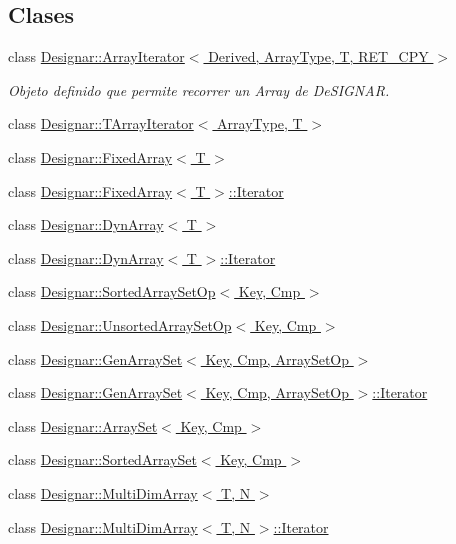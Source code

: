 \subsection*{Clases}
\begin{DoxyCompactItemize}
\item 
class \hyperlink{class_designar_1_1_array_iterator}{Designar\+::\+Array\+Iterator$<$ Derived, Array\+Type, T, R\+E\+T\+\_\+\+C\+P\+Y $>$}
\begin{DoxyCompactList}\small\item\em Objeto definido que permite recorrer un Array de De\+S\+I\+G\+N\+AR. \end{DoxyCompactList}\item 
class \hyperlink{class_designar_1_1_t_array_iterator}{Designar\+::\+T\+Array\+Iterator$<$ Array\+Type, T $>$}
\item 
class \hyperlink{class_designar_1_1_fixed_array}{Designar\+::\+Fixed\+Array$<$ T $>$}
\item 
class \hyperlink{class_designar_1_1_fixed_array_1_1_iterator}{Designar\+::\+Fixed\+Array$<$ T $>$\+::\+Iterator}
\item 
class \hyperlink{class_designar_1_1_dyn_array}{Designar\+::\+Dyn\+Array$<$ T $>$}
\item 
class \hyperlink{class_designar_1_1_dyn_array_1_1_iterator}{Designar\+::\+Dyn\+Array$<$ T $>$\+::\+Iterator}
\item 
class \hyperlink{class_designar_1_1_sorted_array_set_op}{Designar\+::\+Sorted\+Array\+Set\+Op$<$ Key, Cmp $>$}
\item 
class \hyperlink{class_designar_1_1_unsorted_array_set_op}{Designar\+::\+Unsorted\+Array\+Set\+Op$<$ Key, Cmp $>$}
\item 
class \hyperlink{class_designar_1_1_gen_array_set}{Designar\+::\+Gen\+Array\+Set$<$ Key, Cmp, Array\+Set\+Op $>$}
\item 
class \hyperlink{class_designar_1_1_gen_array_set_1_1_iterator}{Designar\+::\+Gen\+Array\+Set$<$ Key, Cmp, Array\+Set\+Op $>$\+::\+Iterator}
\item 
class \hyperlink{class_designar_1_1_array_set}{Designar\+::\+Array\+Set$<$ Key, Cmp $>$}
\item 
class \hyperlink{class_designar_1_1_sorted_array_set}{Designar\+::\+Sorted\+Array\+Set$<$ Key, Cmp $>$}
\item 
class \hyperlink{class_designar_1_1_multi_dim_array}{Designar\+::\+Multi\+Dim\+Array$<$ T, N $>$}
\item 
class \hyperlink{class_designar_1_1_multi_dim_array_1_1_iterator}{Designar\+::\+Multi\+Dim\+Array$<$ T, N $>$\+::\+Iterator}
\end{DoxyCompactItemize}
